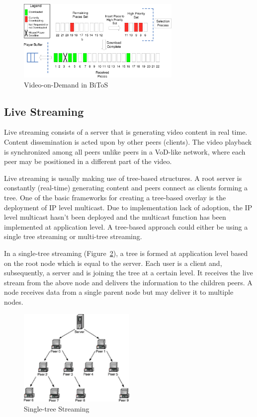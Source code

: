 \begin{figure}
  \centering
  \includegraphics[width=0.7\textwidth]{src/img/p2p-systems/bitos-vod}
  \caption{Video-on-Demand in BiToS}
  \label{fig:p2p-systems:bitos-vod}
\end{figure}

\subsection{Live Streaming}
\label{subsec:p2p-systems:ls}

Live streaming consists of a server that is generating video content in real
time. Content dissemination is acted upon by other peers (clients). The video
playback is synchronized among all peers unlike peers in a VoD-like network,
where each peer may be positioned in a different part of the video.

Live streaming is usually making use of tree-based structures. A root server
is constantly (real-time) generating content and peers connect as clients
forming a tree. One of the basic frameworks for creating a tree-based overlay
is the deployment of IP level multicast. Due to implementation lack of
adoption, the IP level multicast hasn't been deployed and the multicast
function has been implemented at application level. A tree-based approach
could either be using a single tree streaming or multi-tree streaming.

In a single-tree streaming
(Figure~\ref{fig:p2p-systems:single-tree-streaming}), a tree is formed at
application level based on the root node which is equal to the server. Each
user is a client and, subsequently, a server and is joining the tree at a
certain level. It receives the live stream from the above node and delivers
the information to the children peers. A node receives data from a single
parent node but may deliver it to multiple nodes.

\begin{figure}
  \centering
  \includegraphics[width=0.5\textwidth]{src/img/p2p-systems/single-tree-streaming}
  \caption{Single-tree Streaming}
  \label{fig:p2p-systems:single-tree-streaming}
\end{figure}

